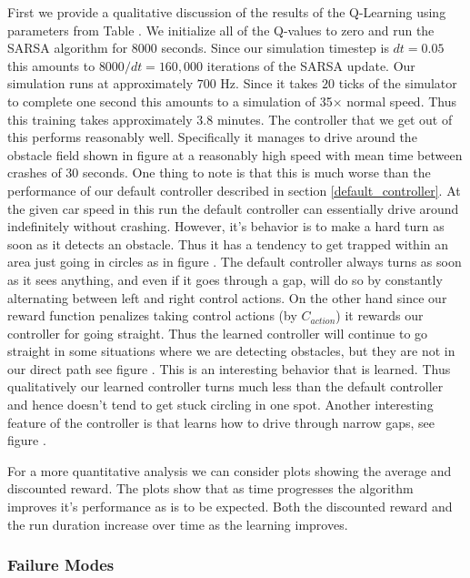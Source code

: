 \documentclass{article}
\begin{document}
First we provide a qualitative discussion of the results of the Q-Learning using parameters from Table . We initialize all of the Q-values to zero and run the SARSA algorithm for 8000 seconds. Since our simulation timestep is $dt = 0.05$ this amounts to $8000/dt = 160,000$ iterations of the SARSA update. Our simulation runs at approximately $700$ Hz. Since it takes $20$ ticks of the simulator to complete one second this amounts to a simulation of 35$\times$ normal speed. Thus this training takes approximately $3.8$ minutes. The controller that we get out of this performs reasonably well. Specifically it manages to drive around the obstacle field shown in figure  at a reasonably high speed with mean time between crashes of  30 seconds. One thing to note is that this is much worse than the performance of our default controller described in section \ref{default_controller}. At the given car speed in this run the default controller can essentially drive around indefinitely without crashing. However, it's behavior is to make a hard turn as soon as it detects an obstacle. Thus it has a tendency to get trapped within an area just going in circles as in figure . The default controller always turns as soon as it sees anything, and even if it goes through a gap, will do so by constantly alternating between left and right control actions. On the other hand since our reward function penalizes taking control actions (by $C_{action}$) it rewards our controller for going straight. Thus the learned controller will continue to go straight in some situations where we are detecting obstacles, but they are not in our direct path see figure . This is an interesting behavior that is learned. Thus qualitatively our learned controller turns much less than the default controller and hence doesn't tend to get stuck circling in one spot. Another interesting feature of the controller is that learns how to drive through narrow gaps, see figure .

For a more quantitative analysis we can consider plots showing the average and discounted reward. The plots show that as time progresses the algorithm improves it's performance as is to be expected. Both the discounted reward and the run duration increase over time as the learning improves. 


\subsubsection{Failure Modes}
\label{failure_modes}
\end{document}
